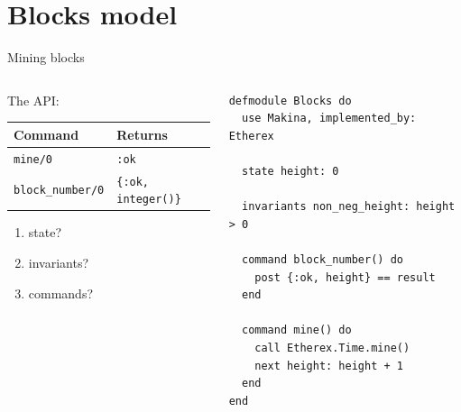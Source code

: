 \documentclass[aspectratio=169, 10pt]{beamer}
\begin{document}
\section{Blocks model}
\label{sec:orgc428aec}
\begin{frame}[label={sec:org18d2040},fragile]{Mining blocks}
 \begin{columns}
\begin{column}{0.48\columnwidth}
The API:

\begin{center}
\begin{tabular}{ll}
Command & Returns\\
\hline
\texttt{mine/0} & \texttt{:ok}\\
\texttt{block\_number/0} & \texttt{\{:ok, integer()\}}\\
\end{tabular}
\end{center}

\vspace{0.5cm}

\begin{enumerate}
\item state?
\item invariants?
\item commands?
\end{enumerate}
\end{column}

\begin{column}{0.48\columnwidth}
\lstset{language=elixir,label= ,caption= ,captionpos=b,numbers=none,style=display}
\begin{lstlisting}
defmodule Blocks do
  use Makina, implemented_by: Etherex

  state height: 0

  invariants non_neg_height: height > 0

  command block_number() do
    post {:ok, height} == result
  end

  command mine() do
    call Etherex.Time.mine()
    next height: height + 1
  end
end
\end{lstlisting}
\end{column}
\end{columns}
\end{frame}
\end{document}
